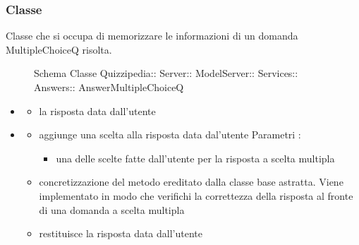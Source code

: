 \subsubsection{Classe }
Classe che si occupa di memorizzare le informazioni di un domanda MultipleChoiceQ risolta.
\begin{figure}[H]
\centering
\noindent{}
\caption[Schema Classe AnswerMultipleChoiceQ]{Schema Classe Quizzipedia:: Server:: ModelServer:: Services:: Answers:: AnswerMultipleChoiceQ}
\end{figure}
\begin{itemize}
\item {}
\begin{itemize}
\item {}
\newline
la risposta data dall'utente
\end{itemize}
\item {}
\begin{itemize}
\item {}
\newline
aggiunge una scelta alla risposta data dal'utente
\newline
Parametri :
\begin{itemize}
\item {}
\newline
una delle scelte fatte dall'utente per la risposta a scelta multipla
\end{itemize}
\item {}
\newline
concretizzazione del metodo ereditato dalla classe base astratta. Viene implementato in modo che verifichi la correttezza della risposta al fronte di una domanda a scelta multipla
\newline
\item {}
\newline
restituisce la risposta data dall'utente
\newline
\end{itemize}
\end{itemize}
